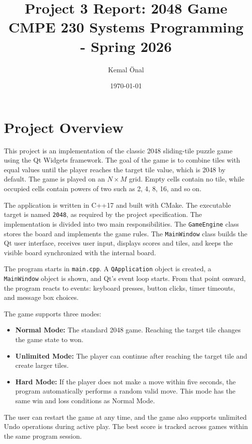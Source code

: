 \documentclass[a4paper,12pt]{article}
\title{Project 3 Report: 2048 Game\\
\large CMPE 230 Systems Programming - Spring 2026}
\author{
Kemal Önal 
}
\date{\today}
\begin{document}
\maketitle

\section{Project Overview}

This project is an implementation of the classic 2048 sliding-tile puzzle game using the Qt Widgets framework. The goal of the game is to combine tiles with equal values until the player reaches the target tile value, which is 2048 by default. The game is played on an \(N \times M\) grid. Empty cells contain no tile, while occupied cells contain powers of two such as 2, 4, 8, 16, and so on.

The application is written in C++17 and built with CMake. The executable target is named \texttt{2048}, as required by the project specification. The implementation is divided into two main responsibilities. The \texttt{GameEngine} class stores the board and implements the game rules. The \texttt{MainWindow} class builds the Qt user interface, receives user input, displays scores and tiles, and keeps the visible board synchronized with the internal board.

The program starts in \texttt{main.cpp}. A \texttt{QApplication} object is created, a \texttt{MainWindow} object is shown, and Qt's event loop starts. From that point onward, the program reacts to events: keyboard presses, button clicks, timer timeouts, and message box choices.

The game supports three modes:

\begin{itemize}
    \item \textbf{Normal Mode:} The standard 2048 game. Reaching the target tile changes the game state to won.
    \item \textbf{Unlimited Mode:} The player can continue after reaching the target tile and create larger tiles.
    \item \textbf{Hard Mode:} If the player does not make a move within five seconds, the program automatically performs a random valid move. This mode has the same win and loss conditions as Normal Mode.
\end{itemize}

The user can restart the game at any time, and the game also supports unlimited Undo operations during active play. The best score is tracked across games within the same program session.
\end{document}
